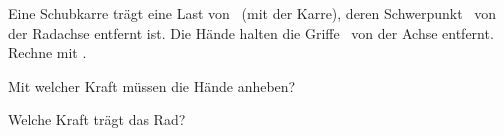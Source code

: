 Eine Schubkarre trägt eine Last von \MLO\ (mit der Karre), deren Schwerpunkt \aLO\ von der Radachse entfernt ist. Die Hände halten die Griffe \bGO\ von der Achse entfernt. Rechne mit \gO.

\begin{abcliste}
\abc
Mit welcher Kraft müssen die Hände anheben?

\abc
Welche Kraft trägt das Rad?
\end{abcliste}
